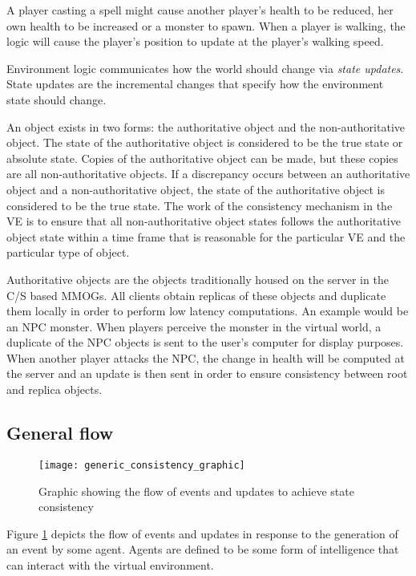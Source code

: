 A player casting a spell might cause another player's health to be reduced, her own health to be increased or a monster to spawn. When a player is walking, the logic will cause the player's position to update at the player's walking speed.

Environment logic communicates how the world should change via \emph{state updates}. State updates are the incremental changes that specify how the environment state should change.

An object exists in two forms: the authoritative object and the non-authoritative object. The state of the authoritative object is considered to be the true state or absolute state. Copies of the authoritative object can be made, but these copies are all non-authoritative objects. If a discrepancy occurs between an authoritative object and a non-authoritative object, the state of the authoritative object is considered to be the true state. The work of the consistency mechanism in the VE is to ensure that all non-authoritative object states follows the authoritative object state within a time frame that is reasonable for the particular VE and the particular type of object.

Authoritative objects are the objects traditionally housed on the server in the C/S based MMOGs. All clients obtain replicas of these objects and duplicate them locally in order to perform low latency computations. An example would be an NPC monster. When players perceive the monster in the virtual world, a duplicate of the NPC objects is sent to the user's computer for display purposes. When another player attacks the NPC, the change in health will be computed at the server and an update is then sent in order to ensure consistency between root and replica objects.

\subsection{General flow}
\label{general_flow}

\begin{figure}[htbp]
 \centering
 \texttt{[image: generic\_consistency\_graphic]}
 \caption{Graphic showing the flow of events and updates to achieve state consistency}
 \label{fig_event_update_flow_graphic}
\end{figure}

Figure \ref{fig_event_update_flow_graphic} depicts the flow of events and updates in response to the generation of an event by some agent. Agents are defined to be some form of intelligence that can interact with the virtual environment.

